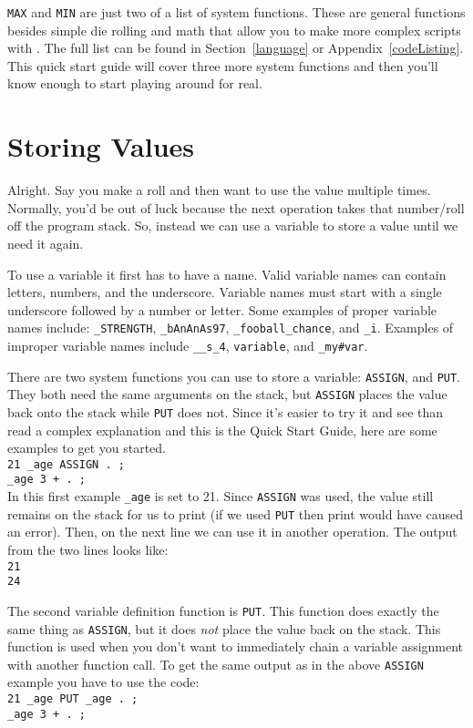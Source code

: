 \texttt{MAX} and \texttt{MIN} are just two of a list of system functions. These are
general functions besides simple die rolling and math that allow you to make
more complex scripts with \progLogo. The full list can be found in 
Section~\ref{language} or Appendix~\ref{codeListing}.
This quick start guide will cover three more system
functions and then you'll know enough to start playing around for real.

\section{Storing Values}
\label{firstVariables}
Alright. Say you make a roll and then want to use the value multiple times.
Normally, you'd be out of luck because the next operation takes that number/roll
off the program stack. So, instead we can use a variable to store a value
until we need it again.

To use a variable it first has to have a name. Valid variable names can contain
letters, numbers, and the underscore. Variable names must start with a single
underscore followed by a number or letter. Some examples of proper variable
names include: \texttt{\_STRENGTH}, \texttt{\_bAnAnAs97},
\texttt{\_fooball\_chance}, and \texttt{\_i}. Examples of improper variable names
include \texttt{\_\_s\_4}, \texttt{variable}, and \texttt{\_my\#var}. 

There are two system functions you can use to store a variable:
\texttt{ASSIGN}, and \texttt{PUT}. They both need the same arguments on the
stack, but \texttt{ASSIGN} places the value back onto the stack while \texttt{PUT}
does not. Since it's easier to try it and see than read a complex explanation
and this is the Quick Start Guide, here are some examples to get you started.\\
\indent\texttt{21 \_age ASSIGN . ;}\\
\indent\texttt{\_age 3 + . ;}\\
In this first example \texttt{\_age} is set to 21. Since \texttt{ASSIGN} was used, the
value still remains on the stack for us to print (if we used
\texttt{PUT} then print would have caused an error). Then, on the next line we can
use it in another operation. The output from the two lines looks like:\\
\texttt{21\\24}

The second variable definition function is \texttt{PUT}. This function does
exactly the same thing as \texttt{ASSIGN}, but it does \emph{not} place the
value back on the stack. This function is used when you don't want to
immediately chain a variable assignment with another function call. To get
the same output as in the above \texttt{ASSIGN} example you have to use the
code:\\
\indent\texttt{21 \_age PUT \_age . ;}\\
\indent\texttt{\_age 3 + . ;}


